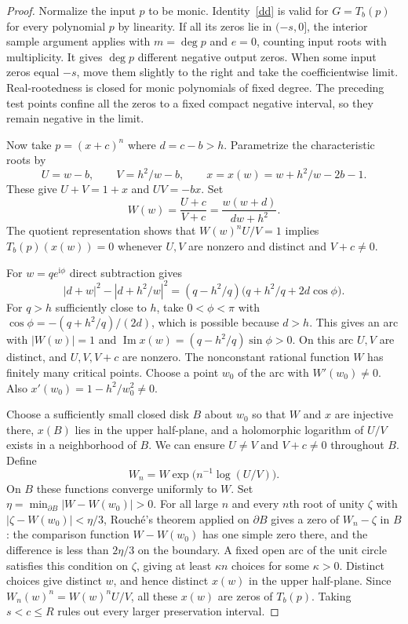 \documentclass[11pt]{article}
\newcommand{\ii}{\mathrm{i}}
\begin{document}
\begin{proof}
Normalize the input $p$ to be monic. Identity~\eqref{dd} is valid for $G=T_b(p)$ for every polynomial $p$ by linearity. If all its zeros lie in $(-s,0]$, the interior sample argument applies with $m=\deg p$ and $e=0$, counting input roots with multiplicity. It gives $\deg p$ different negative output zeros. When some input zeros equal $-s$, move them slightly to the right and take the coefficientwise limit. Real-rootedness is closed for monic polynomials of fixed degree. The preceding test points confine all the zeros to a fixed compact negative interval, so they remain negative in the limit.

Now take $p=(x+c)^n$ where $d=c-b>h$. Parametrize the characteristic roots by
\[
 U=w-b,\qquad V=h^2/w-b,\qquad x=x(w)=w+h^2/w-2b-1 .
\]
These give $U+V=1+x$ and $UV=-bx$. Set
\[
 W(w)=\frac{U+c}{V+c}=\frac{w(w+d)}{dw+h^2}.
\]
The quotient representation shows that $W(w)^n U/V=1$ implies $T_b(p)(x(w))=0$ whenever $U,V$ are nonzero and distinct and $V+c\ne0$.

For $w=q e^{\ii\phi}$ direct subtraction gives
\[
 |d+w|^2-|d+h^2/w|^2
 =(q-h^2/q)\big(q+h^2/q+2d\cos\phi\big).
\]
For $q>h$ sufficiently close to $h$, take $0<\phi<\pi$ with $\cos\phi=-(q+h^2/q)/(2d)$, which is possible because $d>h$. This gives an arc with $|W(w)|=1$ and $\operatorname{Im}x(w)=(q-h^2/q)\sin\phi>0$. On this arc $U,V$ are distinct, and $U,V,V+c$ are nonzero. The nonconstant rational function $W$ has finitely many critical points. Choose a point $w_0$ of the arc with $W'(w_0)\ne0$. Also $x'(w_0)=1-h^2/w_0^2\ne0$.

Choose a sufficiently small closed disk $B$ about $w_0$ so that $W$ and $x$ are injective there, $x(B)$ lies in the upper half-plane, and a holomorphic logarithm of $U/V$ exists in a neighborhood of $B$. We can ensure $U\ne V$ and $V+c\ne0$ throughout $B$. Define
\[
 W_n=W\exp\big(n^{-1}\log(U/V)\big).
\]
On $B$ these functions converge uniformly to $W$. Set $\eta=\min_{\partial B}|W-W(w_0)|>0$. For all large $n$ and every $n$th root of unity $\zeta$ with $|\zeta-W(w_0)|<\eta/3$, Rouch\'e's theorem applied on $\partial B$ gives a zero of $W_n-\zeta$ in $B$: the comparison function $W-W(w_0)$ has one simple zero there, and the difference is less than $2\eta/3$ on the boundary. A fixed open arc of the unit circle satisfies this condition on $\zeta$, giving at least $\kappa n$ choices for some $\kappa>0$. Distinct choices give distinct $w$, and hence distinct $x(w)$ in the upper half-plane. Since $W_n(w)^n=W(w)^nU/V$, all these $x(w)$ are zeros of $T_b(p)$. Taking $s<c\le R$ rules out every larger preservation interval.
\end{proof}
\end{document}

